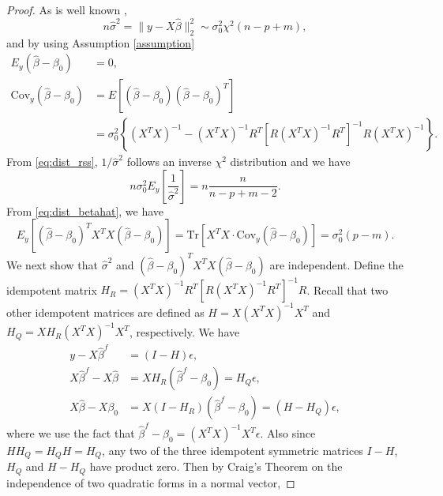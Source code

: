 \begin{proof}
As is well known ,
\begin{equation}
  n\hat\sigma^2 = \lVert y-X\hat{\beta} \rVert_2^2 \sim \sigma_0^2 \chi^2(n-p+m),
  \label{eq:dist_rss}
\end{equation}
and by using Assumption \ref{assumption}
\begin{equation}
\begin{aligned}
E_y\left(\hat{\beta} - \beta_0 \right) &= 0,\\
\text{Cov}_y\left(\hat{\beta} - \beta_0 \right) &= E\left[\left(\hat{\beta} - \beta_0 \right)\left(\hat{\beta} - \beta_0 \right)^T \right]\\
&= \sigma_0^2 \left\{ (X^T X)^{-1} - (X^T X)^{-1}R^T\left[ R(X^T X)^{-1}R^T \right]^{-1} R(X^T X)^{-1} \right\}.
\end{aligned}
\label{eq:dist_betahat}
\end{equation}
From \eqref{eq:dist_rss}, $1/\hat{\sigma}^2$ follows an inverse $\chi^2$ distribution and we have
\begin{equation*}
n \sigma_0^2 E_y\left[ \frac{1}{\hat{\sigma}^2} \right] = n\frac{n}{n-p+m-2}.
\end{equation*}
From \eqref{eq:dist_betahat}, we have
\begin{equation*}
E_y  \left [ (\hat \beta-\beta_0)^T X^T X (\hat \beta-\beta_0) \right ] 
= \text{Tr} \left[ X^T X \cdot \text{Cov}_y \left( \hat{\beta} - \beta_0 \right) \right]
= \sigma_0^2 (p-m).
\end{equation*}
We next show that $\hat{\sigma}^2$ and $(\hat \beta-\beta_0)^T X^T X (\hat \beta-\beta_0)$ are independent. Define the idempotent matrix $H_R=(X^T X)^{-1} R^T \left[ R (X^T X)^{-1} R^T \right]^{-1} R$. Recall that two other idempotent matrices are defined as $H=X(X^T X)^{-1} X^T$ and $H_Q = X H_R (X^T X)^{-1} X^T$, respectively. We have
\begin{equation*}
\begin{aligned}
y-X\hat{\beta}^f &= (I-H)\epsilon,\\
X\hat{\beta}^f - X\hat{\beta} &= XH_R(\hat{\beta}^f - \beta_0) =H_Q \epsilon,\\
X\hat{\beta} - X\beta_0 &= X(I-H_R)(\hat{\beta}^f - \beta_0) = (H-H_Q) \epsilon,
\end{aligned}
\end{equation*}
where we use the fact that $\hat{\beta}^f - \beta_0 = (X^T X)^{-1}X^T \epsilon$. Also since $HH_Q=H_QH=H_Q$, any two of the three idempotent symmetric matrices $I-H$, $H_Q$ and $H-H_Q$ have product zero. Then by Craig's Theorem  on the independence of two quadratic forms in a normal vector, 

\end{proof}
